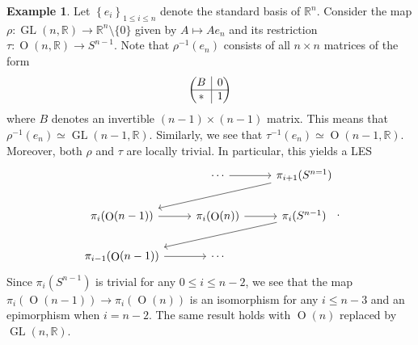 \documentclass[10pt,letterpaper,cm]{nupset}
\theoremstyle{definition}
\newtheorem{exmp}[defn]{Example}
\theoremstyle{theorem}
\theoremstyle{remark}
\newcommand{\R}{\mathbb{R}}
\newcommand{\1}{\mathbb{1}}
\newcommand{\0}{\vec 0}
\DeclareMathOperator{\GL}{GL}
\DeclareMathOperator{\Or}{O}
\newcommand{\rvline}{\hspace*{-\arraycolsep}\vline\hspace*{-\arraycolsep}}
\begin{document}
\begin{exmp}
Let $\left\{e_i\right\}_{1\leq i \leq n}$ denote the standard basis of $\R^n$.  Consider the map $\rho : \GL(n, \R) \to \R^n\setminus \{0\}$ given by $A \mapsto A{e_n}$ and its restriction $\tau : \Or(n, \R) \to S^{n-1}$.
Note that $\rho^{-1}(e_n)$ consists of all $n\times n$ matrices of the form 
\[
\begin{pmatrix}
  \begin{matrix}
 B
  \end{matrix}
  & \rvline & 0 \\
\hline
  \ast & \rvline &
  \begin{matrix}
 1
  \end{matrix}
\end{pmatrix}
\]
where $B$ denotes an invertible $\left(n-1\right) \times \left(n-1\right)$ matrix. This means that $\rho^{-1}(e_n) \simeq \GL(n-1, \R)$. Similarly, we see that $\tau^{-1}(e_n)\simeq \Or(n-1, \R)$. Moreover, both $\rho$ and $\tau$ are locally trivial. In particular, this yields a LES
\[
\begin{tikzcd}
                              & \cdots \arrow[r]        & \pi_{i+1}(S^{n=1}) \arrow[lld] \\
\pi_i(\Or(n-1)) \arrow[r]     & \pi_i(\Or(n)) \arrow[r] & \pi_i(S^{n-1}) \arrow[lld]     \\
\pi_{i-1}(\Or(n-1)) \arrow[r] & \cdots                  &                               
\end{tikzcd}.
\]
Since $\pi_i(S^{n-1})$ is trivial for any $0 \leq i \leq n-2$, we see that the map $\pi_i(\Or(n-1)) \to \pi_i(\Or(n))$ is an isomorphism for any $i\leq n-3$ and an epimorphism when $i=n-2$. The same result holds with $\Or(n)$ replaced by $\GL(n,\R)$.
\end{exmp}
\end{document}
